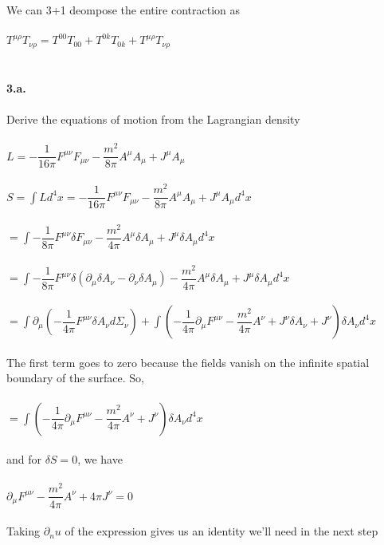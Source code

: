 \documentclass[prb,preprint]
{revtex4-1}
\newcommand{\PRLsep}{\noindent\makebox[\linewidth]{\resizebox{0.8888\linewidth}{2pt}{$\bullet$}}\bigskip}
\begin{document}
\\
We can 3+1 deompose the entire contraction as 
\\
\\
$T^{\mu\rho} T_{\nu\rho} = T^{00} T_{00} + T^{0k} T_{0k} + T^{\mu\rho} T_{\nu\rho}$
\\
\\
\\
\PRLsep
\newpage
\textbf{3.a.}
\\
\\
Derive the equations of motion from the Lagrangian density
\\
\\
$L = -\dfrac{1}{16\pi}F^{\mu\nu}F_{\mu\nu}-\dfrac{m^2}{8\pi}A^\mu A_\mu + J^\mu A_\mu$
\\
\\
$S = \int L d^4x = -\dfrac{1}{16\pi}F^{\mu\nu}F_{\mu\nu}-\dfrac{m^2}{8\pi}A^\mu A_\mu + J^\mu A_\mu d^4x$
\\
\\
$= \int -\dfrac{1}{8\pi}F^{\mu\nu}\delta F_{\mu\nu}-\dfrac{m^2}{4\pi}A^\mu \delta A_\mu + J^\mu \delta A_\mu d^4x$
\\
\\
$= \int -\dfrac{1}{8\pi}F^{\mu\nu}\delta \left(\partial_\mu \delta A_\nu - \partial_\nu \delta A_\mu\right)-\dfrac{m^2}{4\pi}A^\mu \delta A_\mu + J^\mu \delta A_\mu d^4x$
\\
\\
$= \int \partial_\mu \left( -\dfrac{1}{4\pi}F^{\mu\nu}\delta A_\nu d\Sigma_\nu \right) + \int  \left( -\dfrac{1}{4\pi}\partial_\mu F^{\mu\nu} - \dfrac{m^2}{4\pi} A^\nu + J^\nu \delta A_\nu + J^\nu \right) \delta A_\nu d^4x$
\\
\\
The first term goes to zero because the fields vanish on the infinite spatial boundary of the surface. So, 
\\
\\
$= \int  \left( -\dfrac{1}{4\pi}\partial_\mu F^{\mu\nu} - \dfrac{m^2}{4\pi} A^\nu + J^\nu \right) \delta A_\nu d^4x$
\\
\\
and for $\delta S = 0$, we have
\\
\\
$\partial_\mu F^{\mu\nu} - \dfrac{m^2}{4\pi} A^\nu + 4\pi J^\nu = 0$
\\
\\
Taking $\partial_nu$ of the expression gives us an identity we'll need in the next step
\\
\\
\end{document}
